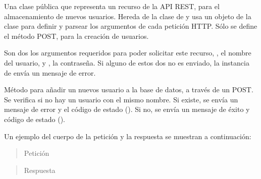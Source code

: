 Una clase pública que representa un recurso de la API REST, para el
almacenamiento de nuevos usuarios. Hereda de la clase  de
 y usa un objeto de la clase  para definir
y parsear los argumentos de cada petición HTTP. Sólo se define el método
POST, para la creación de usuarios.

Son dos los argumentos requeridos para poder solicitar este recurso,
, el nombre del usuario, y , la contraseña. Si alguno
de estos dos no es enviado, la instancia de  envía un mensaje
de error.

\begin{fulllineitems}
\label{\detokenize{chapter_two/desc_cloudnao:app.resources.user.UserRegister.post}}
Método para añadir un nuevos usuario a la base de datos, a través de
un POST. Se verifica si no hay un usuario con el mismo nombre. Si existe,
se envía un mensaje de error y el código de estado  ().
Si no, se envía un mensaje de éxito y código de estado  ().

Un ejemplo del cuerpo de la petición y la respuesta se muestran a
continuación:
\begin{quote}\begin{description}
\item[{Petición}] \leavevmode
\end{description}\end{quote}

\begin{sphinxVerbatim}[commandchars=\\\{\}]
    
    
\end{sphinxVerbatim}
\begin{quote}\begin{description}
\item[{Respuesta}] \leavevmode
\end{description}\end{quote}

\begin{sphinxVerbatim}[commandchars=\\\{\}]
    
    
\end{sphinxVerbatim}

\end{fulllineitems}


